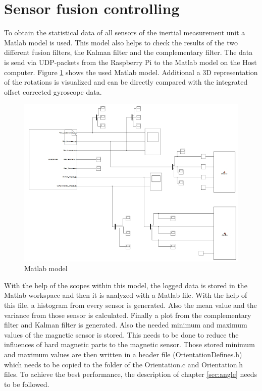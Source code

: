 \newpage
\section{Sensor fusion controlling}
\label{sec:SensFusContr}

To obtain the statistical data of all sensors of the inertial measurement unit a Matlab model is used. This model also helps to check the results of the two different fusion filters, the Kalman filter and the complementary filter. The data is send via UDP-packets from the Raspberry Pi to the Matlab model on the Host computer. Figure \ref{fig:model} shows the used Matlab model. Additional a 3D representation of the rotations is visualized and can be directly compared with the integrated offset corrected gyroscope data.

\begin{figure}[H]
	\centering\includegraphics[width=1\textwidth]{fig/Res_Kal_Comp/Model}
	\caption{Matlab model}
	\label{fig:model}
\end{figure}

\newpage
With the help of the scopes within this model, the logged data is stored in the Matlab workspace and then it is analyzed with a Matlab file. With the help of this file, a histogram from every sensor is generated. Also the mean value and the variance from those sensor is calculated. Finally a plot from the complementary filter and Kalman filter is generated. Also the needed minimum and maximum values of the magnetic sensor is stored. This needs to be done to reduce the influences of hard magnetic parts to the magnetic sensor. Those stored minimum and maximum values are then written in a header file (OrientationDefines.h) which needs to be copied to the folder of the Orientation.c and Orientation.h files. To achieve the best performance, the description of chapter \ref{sec:angle} needs to be followed.

